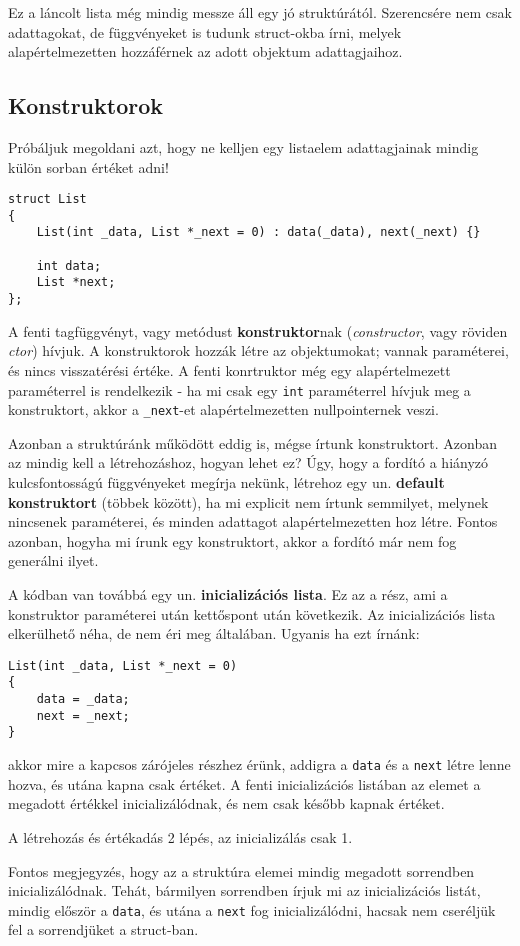 \documentclass[a4paper,11.5pt]{article}
\begin{document}
	\medskip
	Ez a láncolt lista még mindig messze áll egy jó struktúrától. Szerencsére nem csak adattagokat, de függvényeket is tudunk struct-okba írni, melyek alapértelmezetten hozzáférnek az adott objektum adattagjaihoz.
	\subsection{Konstruktorok}
	Próbáljuk megoldani azt, hogy ne kelljen egy listaelem adattagjainak mindig külön sorban értéket adni!
	\begin{lstlisting}
struct List
{
	List(int _data, List *_next = 0) : data(_data), next(_next) {}
	
	int data;
	List *next;
};
	\end{lstlisting}
	A fenti tagfüggvényt, vagy metódust \textbf{konstruktor}nak (\textit{constructor}, vagy röviden \textit{ctor}) hívjuk. A konstruktorok hozzák létre az objektumokat; vannak paraméterei, és nincs visszatérési értéke. A fenti konrtruktor még egy alapértelmezett paraméterrel is rendelkezik - ha mi csak egy \texttt{int} paraméterrel hívjuk meg a konstruktort, akkor a \texttt{\_next}-et alapértelmezetten nullpointernek veszi.
	
	\medskip
	Azonban a struktúránk működött eddig is, mégse írtunk konstruktort. Azonban az mindig kell a létrehozáshoz, hogyan lehet ez? Úgy, hogy a fordító a hiányzó kulcsfontosságú függvényeket megírja nekünk, létrehoz egy un. \textbf{default konstruktort} (többek között), ha mi explicit nem írtunk semmilyet, melynek nincsenek paraméterei, és minden adattagot alapértelmezetten hoz létre. Fontos azonban, hogyha mi írunk egy konstruktort, akkor a fordító már nem fog generálni ilyet.
	
	\medskip
	A kódban van továbbá egy un. \textbf{inicializációs lista}. Ez az a rész, ami a konstruktor paraméterei után kettőspont után következik. Az inicializációs lista elkerülhető néha, de nem éri meg általában. Ugyanis ha ezt írnánk:
	\begin{lstlisting}
List(int _data, List *_next = 0)
{
	data = _data;
	next = _next;
}
	\end{lstlisting}
	akkor mire a kapcsos zárójeles részhez érünk, addigra a \texttt{data} és a \texttt{next} létre lenne hozva, és utána kapna csak értéket. A fenti inicializációs listában az elemet a megadott értékkel inicializálódnak, és nem csak később kapnak értéket.
	\begin{note}
		A létrehozás és értékadás 2 lépés, az inicializálás csak 1.
	\end{note}
	Fontos megjegyzés, hogy az a struktúra elemei mindig megadott sorrendben inicializálódnak. Tehát, bármilyen sorrendben írjuk mi az inicializációs listát, mindig először a \texttt{data}, és utána a \texttt{next} fog inicializálódni, hacsak nem cseréljük fel a sorrendjüket a struct-ban.
\end{document}
